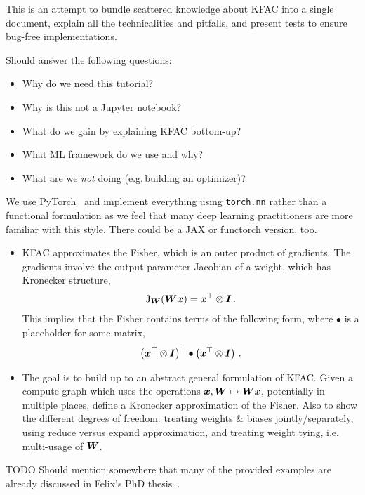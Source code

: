 This is an attempt to bundle scattered knowledge about KFAC into a single document, explain all the technicalities and pitfalls, and present tests to ensure bug-free implementations.

Should answer the following questions:
\begin{itemize}
\item Why do we need this tutorial?
\item Why is this not a Jupyter notebook?
\item What do we gain by explaining KFAC bottom-up?
\item What ML framework do we use and why?
\item What are we \emph{not} doing (e.g.\,building an optimizer)?
\end{itemize}

We use PyTorch~\cite{paszke2019pytorch} and implement everything using \texttt{torch.nn} rather than a functional formulation as we feel that many deep learning practitioners are more familiar with this style.
There could be a JAX or functorch version, too.

\begin{itemize}
\item KFAC approximates the Fisher, which is an outer product of gradients. The gradients involve the output-parameter Jacobian of a weight, which has Kronecker structure,
  \begin{align}
    \mathrm{J}_{{\bm{W}}}({\bm{W}} {\bm{x}}) = {\bm{x}}^{\top} \otimes {\bm{I}}\,.
  \end{align}
  This implies that the Fisher contains terms of the following form, where $\bullet$ is a placeholder for some matrix,
  \begin{align}
    \left(
    {\bm{x}}^{\top}\otimes {\bm{I}}
    \right)^{\top}
    \bullet
    \left(
    {\bm{x}}^{\top}\otimes {\bm{I}}
    \right)\,.
  \end{align}

\item The goal is to build up to an abstract general formulation of KFAC.
  Given a compute graph which uses the operations ${\bm{x}}, {\bm{W}} \mapsto {\bm{W}} x$, potentially in multiple places, define a Kronecker approximation of the Fisher.
  Also to show the different degrees of freedom: treating weights \& biases jointly/separately, using reduce versus expand approximation, and treating weight tying, i.e.
  multi-usage of ${\bm{W}}$.

\end{itemize}
TODO Should mention somewhere that many of the provided examples are already discussed in Felix's PhD thesis~\cite{dangel2023backpropagation}.

